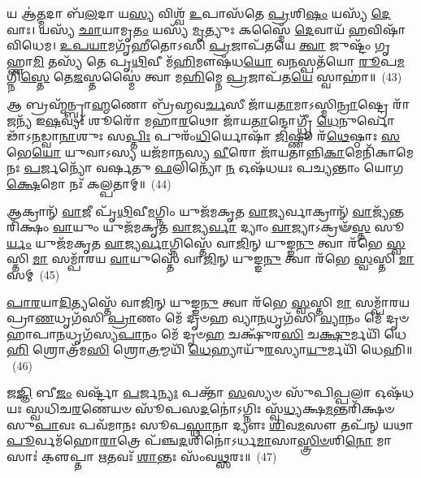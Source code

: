 {\anuvakamend[{𑌯𑌃 𑌪𑍍𑌰𑌾᳴\-\ul{𑌣}\-𑌤𑍋 𑌦𑍍𑌯𑍗𑌰𑌾᳴\-\ul{𑌦𑌿}\-𑌤𑍍𑌯𑍋॑\-𑌽𑌷𑍍𑌟𑌾𑌤𑍍𑌰𑌿𑍞᳴𑌶𑌤𑍍}]}%

𑌯 𑌆॑\-\ul{𑌤𑍍𑌮}\-𑌦𑌾 𑌬᳴\-\ul{𑌲}\-𑌦𑌾 𑌯\-\ul{𑌸𑍍𑌯} 𑌵𑌿𑌶𑍍𑌵᳴ \ul{𑌉}\-𑌪𑌾𑌸᳴𑌤𑍇 \ul{𑌪𑍍𑌰}\-𑌶𑌿\-\ul{𑌷𑌂} 𑌯𑌸𑍍𑌯᳴ \ul{𑌦𑍇}\-𑌵𑌾𑌃। 𑌯𑌸𑍍𑌯᳴ \ul{𑌛𑌾}\-𑌯𑌾𑌮𑍃\-\ul{𑌤𑌂} 𑌯𑌸𑍍𑌯᳴ \ul{𑌮𑍃}\-𑌤𑍍𑌯𑍁𑌃 𑌕𑌸𑍍𑌮𑍈᳴ \ul{𑌦𑍇}\-𑌵𑌾𑌯᳴ \ul{𑌹}\-𑌵𑌿𑌷𑌾᳴ 𑌵𑌿𑌧𑍇𑌮। \ul{𑌉}\-\-\ul{𑌪}\-\-\ul{𑌯𑌾}\-𑌮𑌗𑍃᳴𑌹𑍀𑌤𑍋\-𑌽𑌸𑌿 \ul{𑌪𑍍𑌰}\-𑌜𑌾𑌪᳴𑌤𑌯𑍇 \ul{𑌤𑍍𑌵𑌾} 𑌜𑍁𑌷𑍍𑌟𑌂᳴ 𑌗𑍃𑌹𑍍𑌣𑌾\-\ul{𑌮𑌿} 𑌤𑌸𑍍𑌯᳴ 𑌤𑍇 𑌪𑍃\-\ul{𑌥𑌿}\-𑌵𑍀 𑌮᳴\-\ul{𑌹𑌿}\-𑌮𑍗𑌷᳴𑌧\-\ul{𑌯𑍋} 𑌵\-\ul{𑌨}\-𑌸𑍍𑌪𑌤᳴𑌯𑍋 \ul{𑌰𑍂}\-𑌪\-\ul{𑌮}\-𑌗𑍍𑌨𑌿\-\ul{𑌸𑍍𑌤𑍇} 𑌤𑍇\-\ul{𑌜}\-𑌸𑍍𑌤𑌸𑍍𑌮𑍈॑ 𑌤𑍍𑌵𑌾 𑌮\-\ul{𑌹𑌿}\-𑌮𑍍𑌨𑍇 \ul{𑌪𑍍𑌰}\-𑌜𑌾𑌪᳴𑌤\-\ul{𑌯𑍇} 𑌸𑍍𑌵𑌾𑌹𑌾॑॥~(43)

{\anuvakamend[{𑌯 𑌆॑\-\ul{𑌤𑍍𑌮}\-𑌦𑌾𑌃 𑌪𑍃᳴\-\ul{𑌥𑌿}\-𑌵𑍍𑌯᳴𑌗𑍍𑌨𑌿𑌰𑍇\-\ul{𑌕𑌾}\-𑌨𑍍𑌨𑌚᳴𑌤𑍍𑌵𑌾\-\ul{𑌰𑌿}\-\-\ul{𑍞}\-𑌶𑌤𑍍}]}%

𑌆 𑌬𑍍𑌰𑌹𑍍𑌮᳴𑌨𑍍𑌬𑍍𑌰𑌾\-\ul{𑌹𑍍𑌮}\-𑌣𑍋 𑌬𑍍𑌰᳴𑌹𑍍𑌮𑌵\-\ul{𑌰𑍍𑌚}\-𑌸𑍀 𑌜𑌾᳴𑌯\-\ul{𑌤𑌾}\-𑌮𑌾\-𑌽𑌸𑍍𑌮𑌿\-\ul{𑌨𑍍𑌰𑌾}\-𑌷𑍍𑌟𑍍𑌰𑍇 𑌰𑌾᳴\-\ul{𑌜}\-𑌨𑍍𑌯᳴ 𑌇\-\ul{𑌷}\-𑌵𑍍𑌯𑌃᳴ 𑌶𑍂𑌰𑍋᳴ 𑌮𑌹𑌾\-\ul{𑌰}\-𑌥𑍋 𑌜𑌾᳴𑌯\-\ul{𑌤𑌾}\-𑌨𑍍𑌦𑍋𑌗𑍍𑌧𑍍𑌰𑍀᳴ \ul{𑌧𑍇}\-𑌨𑍁𑌰𑍍𑌵𑍋𑌢𑌾᳴\-𑌽\-\-\ul{𑌨}\-𑌡𑍍𑌵𑌾\-\ul{𑌨𑌾}\-𑌶𑍁𑌃 𑌸\-\ul{𑌪𑍍𑌤𑌿𑌃} 𑌪𑍁𑌰𑌂᳴\-\ul{𑌧𑌿}\-𑌰𑍍𑌯𑍋𑌷𑌾᳴ \ul{𑌜𑌿}\-𑌷𑍍𑌣𑍂 𑌰᳴\-\ul{𑌥𑍇}\-𑌷𑍍𑌠𑌾𑌃 \ul{𑌸}\-𑌭𑍇\-\ul{𑌯𑍋} 𑌯𑍁𑌵𑌾\-𑌽𑌸𑍍𑌯 𑌯𑌜᳴𑌮𑌾𑌨𑌸𑍍𑌯 \ul{𑌵𑍀}\-𑌰𑍋 𑌜𑌾᳴𑌯𑌤𑌾𑌨𑍍𑌨𑌿\-\ul{𑌕𑌾}\-𑌮𑍇𑌨𑌿᳴𑌕𑌾𑌮𑍇 𑌨𑌃 \ul{𑌪}\-𑌰𑍍𑌜𑌨𑍍𑌯𑍋᳴ 𑌵𑌰𑍍\mbox{}𑌷𑌤𑍁 \ul{𑌫}\-𑌲𑌿𑌨𑍍𑌯𑍋᳴ \ul{𑌨} 𑌓𑌷᳴𑌧𑌯𑌃 𑌪𑌚𑍍𑌯𑌨𑍍𑌤𑌾𑌂 𑌯𑍋𑌗\-\ul{𑌕𑍍𑌷𑍇}\-𑌮𑍋 𑌨𑌃᳴ 𑌕𑌲𑍍𑌪𑌤𑌾𑌮𑍍॥~(44)

{\anuvakamend[{𑌆 𑌬𑍍𑌰\-\ul{𑌹𑍍𑌮}\-𑌨𑍍𑌨𑍇𑌕᳴𑌚𑌤𑍍𑌵𑌾𑌰𑌿𑍞𑌶𑌤𑍍}]}%

𑌆𑌕𑍍𑌰𑌾𑌨𑍍᳴ \ul{𑌵𑌾}\-𑌜𑍀 𑌪𑍃᳴\-\ul{𑌥𑌿}\-𑌵𑍀\-\ul{𑌮}\-𑌗𑍍𑌨𑌿𑌂 𑌯𑍁𑌜᳴𑌮𑌕𑍃𑌤 \ul{𑌵𑌾}\-𑌜𑍍𑌯𑌰𑍍𑌵𑌾𑌕𑍍𑌰𑌾𑌨𑍍᳴ \ul{𑌵𑌾}\-𑌜𑍍𑌯᳴𑌨𑍍𑌤𑌰𑌿᳴𑌕𑍍𑌷𑌂 \ul{𑌵𑌾}\-𑌯𑍁𑌂 𑌯𑍁𑌜᳴𑌮𑌕𑍃𑌤 \ul{𑌵𑌾}\-𑌜𑍍𑌯\-\ul{𑌰𑍍𑌵𑌾} 𑌦𑍍𑌯𑌾𑌂 \ul{𑌵𑌾}\-𑌜𑍍𑌯𑌾\-𑌽𑌕𑍍𑌰𑍟᳴\-\ul{𑌸𑍍𑌤} 𑌸𑍂\-\ul{𑌰𑍍𑌯𑌂} 𑌯𑍁𑌜᳴𑌮𑌕𑍃𑌤 \ul{𑌵𑌾}\-𑌜𑍍𑌯\-\ul{𑌰𑍍𑌵𑌾}\-𑌗𑍍𑌨𑌿𑌸𑍍𑌤𑍇᳴ 𑌵𑌾\-\ul{𑌜𑌿}\-𑌨𑍍 𑌯𑍁𑌙𑍍𑌙\-\ul{𑌨𑍁} 𑌤𑍍𑌵𑌾 𑌰᳴𑌭𑍇 \ul{𑌸𑍍𑌵}\-𑌸𑍍𑌤𑌿 \ul{𑌮𑌾} 𑌸𑌮𑍍𑌪𑌾᳴𑌰𑌯 \ul{𑌵𑌾}\-𑌯𑍁𑌸𑍍𑌤𑍇᳴ 𑌵𑌾\-\ul{𑌜𑌿}\-𑌨𑍍 𑌯𑍁𑌙𑍍𑌙\-\ul{𑌨𑍁} 𑌤𑍍𑌵𑌾 𑌰᳴𑌭𑍇 \ul{𑌸𑍍𑌵}\-𑌸𑍍𑌤𑌿 \ul{𑌮𑌾} 𑌸𑌮𑍍~(45)

\-\ul{𑌪𑌾}\-\-\ul{𑌰}\-𑌯𑌾\-\ul{𑌦𑌿}\-𑌤𑍍𑌯𑌸𑍍𑌤𑍇᳴ 𑌵𑌾\-\ul{𑌜𑌿}\-𑌨𑍍 𑌯𑍁𑌙𑍍𑌙\-\ul{𑌨𑍁} 𑌤𑍍𑌵𑌾 𑌰᳴𑌭𑍇 \ul{𑌸𑍍𑌵}\-𑌸𑍍𑌤𑌿 \ul{𑌮𑌾} 𑌸𑌮𑍍𑌪𑌾᳴𑌰𑌯 𑌪𑍍𑌰𑌾\-\ul{𑌣}\-𑌧𑍃𑌗᳴𑌸𑌿 \ul{𑌪𑍍𑌰𑌾}\-𑌣𑌂 𑌮𑍇᳴ 𑌦𑍃𑍞𑌹 𑌵𑍍𑌯𑌾\-\ul{𑌨}\-𑌧𑍃𑌗᳴𑌸𑌿 \ul{𑌵𑍍𑌯𑌾}\-𑌨𑌂 𑌮𑍇᳴ 𑌦𑍃𑍞𑌹𑌾𑌪𑌾\-\ul{𑌨}\-𑌧𑍃𑌗᳴𑌸𑍍𑌯\-\ul{𑌪𑌾}\-𑌨𑌂 𑌮𑍇᳴ 𑌦𑍃𑍞\-\ul{𑌹} 𑌚𑌕𑍍𑌷𑍁᳴𑌰\-\ul{𑌸𑌿} 𑌚\-\ul{𑌕𑍍𑌷𑍁}\-𑌰𑍍𑌮𑌯𑌿᳴ 𑌧𑍇\-\ul{𑌹𑌿} 𑌶𑍍𑌰𑍋𑌤𑍍𑌰᳴𑌮\-\ul{𑌸𑌿} 𑌶𑍍𑌰𑍋\-\ul{𑌤𑍍𑌰}\-𑌮𑍍𑌮𑌯𑌿᳴ \ul{𑌧𑍇}\-𑌹𑍍𑌯𑌾𑌯𑍁᳴\-\ul{𑌰}\-𑌸𑍍𑌯𑌾\-\ul{𑌯𑍁}\-𑌰𑍍𑌮𑌯𑌿᳴ 𑌧𑍇𑌹𑌿॥~(46)

{\anuvakamend[{\-\ul{𑌵𑌾}\-𑌯𑍁𑌸𑍍𑌤𑍇᳴ 𑌵𑌾\-\ul{𑌜𑌿}\-𑌨𑍍 𑌯𑍁𑌙𑍍𑌙\-\ul{𑌨𑍁} 𑌤𑍍𑌵𑌾 𑌰᳴𑌭𑍇 \ul{𑌸𑍍𑌵}\-𑌸𑍍𑌤𑌿 \ul{𑌮𑌾} 𑌸𑌨𑍍𑌤𑍍𑌰𑌿𑌚᳴𑌤𑍍𑌵𑌾𑌰𑌿𑍞𑌶𑌚𑍍𑌚}]}%

𑌜\-\ul{𑌜𑍍𑌞𑌿} 𑌬𑍀\-\ul{𑌜𑌂} 𑌵𑌰𑍍\mbox{}𑌷𑍍𑌟𑌾᳴ \ul{𑌪}\-𑌰𑍍𑌜\-\ul{𑌨𑍍𑌯𑌃} 𑌪𑌕𑍍𑌤𑌾᳴ \ul{𑌸}\-𑌸𑍍𑌯𑍞 𑌸𑍁᳴𑌪𑌿\-\ul{𑌪𑍍𑌪}\-𑌲𑌾 𑌓𑌷᳴𑌧𑌯𑌃 𑌸𑍍𑌵𑌧𑌿𑌚\-\ul{𑌰}\-𑌣𑍇𑌯𑍞 𑌸𑍂᳴𑌪𑌸\-\ul{𑌦}\-𑌨𑍋॑\-𑌽𑌗𑍍𑌨𑌿𑌃 𑌸𑍍𑌵᳴\-\ul{𑌧𑍍𑌯}\-𑌕𑍍𑌷\-\ul{𑌮}\-𑌨𑍍𑌤𑌰𑌿᳴𑌕𑍍𑌷𑍞 𑌸𑍁\-\ul{𑌪𑌾}\-𑌵𑌃 𑌪𑌵᳴𑌮𑌾𑌨𑌃 𑌸𑍂𑌪\-\ul{𑌸𑍍𑌥𑌾}\-𑌨𑌾 𑌦𑍍𑌯𑍗𑌃 \ul{𑌶𑌿}\-𑌵\-\ul{𑌮}\-𑌸𑍗 𑌤𑌪᳴𑌨𑍍 𑌯𑌥𑌾\-\ul{𑌪𑍂}\-𑌰𑍍𑌵𑌮᳴𑌹𑍋\-\ul{𑌰𑌾}\-𑌤𑍍𑌰𑍇 𑌪᳴𑌞𑍍𑌚\-\ul{𑌦}\-𑌶𑌿𑌨𑍋॑\-𑌽𑌰𑍍𑌧\-\ul{𑌮𑌾}\-𑌸𑌾\-\ul{𑌸𑍍𑌤𑍍𑌰𑌿}\-\-\ul{𑍞}\-𑌶𑌿\-\ul{𑌨𑍋} 𑌮𑌾𑌸𑌾𑌃॑ 𑌕𑍢॒𑌪𑍍𑌤𑌾 \ul{𑌋}\-𑌤𑌵𑌃᳴ \ul{𑌶𑌾}\-𑌨𑍍𑌤𑌃 𑌸𑌂᳴𑌵\-\ul{𑌥𑍍𑌸}\-𑌰𑌃॥~(47)

